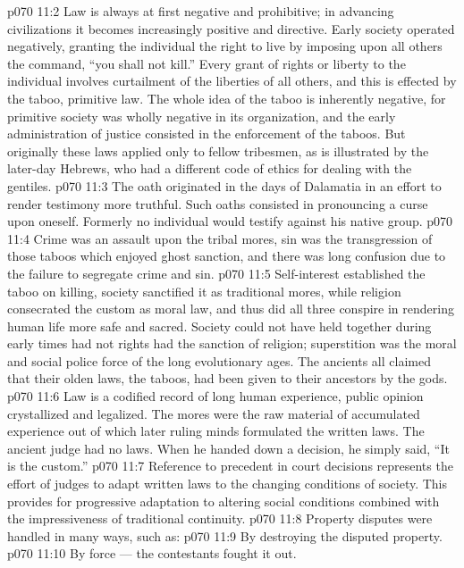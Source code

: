 \vs p070 11:2 Law is always at first negative and prohibitive; in advancing civilizations it becomes increasingly positive and directive. Early society operated negatively, granting the individual the right to live by imposing upon all others the command, “you shall not kill.” Every grant of rights or liberty to the individual involves curtailment of the liberties of all others, and this is effected by the taboo, primitive law. The whole idea of the taboo is inherently negative, for primitive society was wholly negative in its organization, and the early administration of justice consisted in the enforcement of the taboos. But originally these laws applied only to fellow tribesmen, as is illustrated by the later\hyp{}day Hebrews, who had a different code of ethics for dealing with the gentiles.
\vs p070 11:3 The oath originated in the days of Dalamatia in an effort to render testimony more truthful. Such oaths consisted in pronouncing a curse upon oneself. Formerly no individual would testify against his native group.
\vs p070 11:4 \pc Crime was an assault upon the tribal mores, sin was the transgression of those taboos which enjoyed ghost sanction, and there was long confusion due to the failure to segregate crime and sin.
\vs p070 11:5 Self\hyp{}interest established the taboo on killing, society sanctified it as traditional mores, while religion consecrated the custom as moral law, and thus did all three conspire in rendering human life more safe and sacred. Society could not have held together during early times had not rights had the sanction of religion; superstition was the moral and social police force of the long evolutionary ages. The ancients all claimed that their olden laws, the taboos, had been given to their ancestors by the gods.
\vs p070 11:6 Law is a codified record of long human experience, public opinion crystallized and legalized. The mores were the raw material of accumulated experience out of which later ruling minds formulated the written laws. The ancient judge had no laws. When he handed down a decision, he simply said, “It is the custom.”
\vs p070 11:7 Reference to precedent in court decisions represents the effort of judges to adapt written laws to the changing conditions of society. This provides for progressive adaptation to altering social conditions combined with the impressiveness of traditional continuity.
\vs p070 11:8 \pc Property disputes were handled in many ways, such as:
\vs p070 11:9 \bibnobreakspace By destroying the disputed property.
\vs p070 11:10 \bibnobreakspace By force --- the contestants fought it out.
